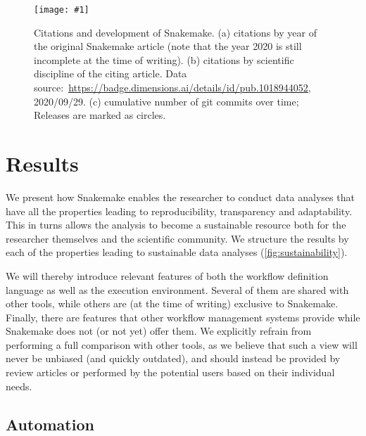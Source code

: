 \documentclass[parskip=half]{scrartcl}
\newcommand{\image}[1]{\centering\texttt{[image: \#1]}}
\let\plainurl\url
\renewcommand{\url}[1]{\protect\plainurl{#1}}
\begin{document}
\begin{figure}
	\image{citations+development.pdf}
	\caption{
		Citations and development of Snakemake.
		(a) citations by year of the original Snakemake article (note that the year 2020 is still incomplete at the time of writing).
		(b) citations by scientific discipline of the citing article.
		Data source:~\url{https://badge.dimensions.ai/details/id/pub.1018944052}, 2020/09/29.
		(c) cumulative number of git commits over time; Releases are marked as circles.
	}
	\label{fig:citations}
\end{figure}

\section{Results}

We present how Snakemake enables the researcher to conduct data analyses that have all the properties leading to reproducibility, transparency and adaptability. This in turns allows the analysis to become a sustainable resource both for the researcher themselves and the scientific community. 
We structure the results by each of the properties leading to sustainable data analyses (\autoref{fig:sustainability}).

We will thereby introduce relevant features of both the workflow definition language as well as the execution environment.
Several of them are shared with other tools, while others are (at the time of writing) exclusive to Snakemake.
Finally, there are features that other workflow management systems provide while Snakemake does not (or not yet) offer them.
We explicitly refrain from performing a full comparison with other tools, as we believe that such a view will never be unbiased (and quickly outdated), and should instead be provided by review articles or performed by the potential users based on their individual needs.

\subsection{Automation}\label{sec:automation}
\end{document}
